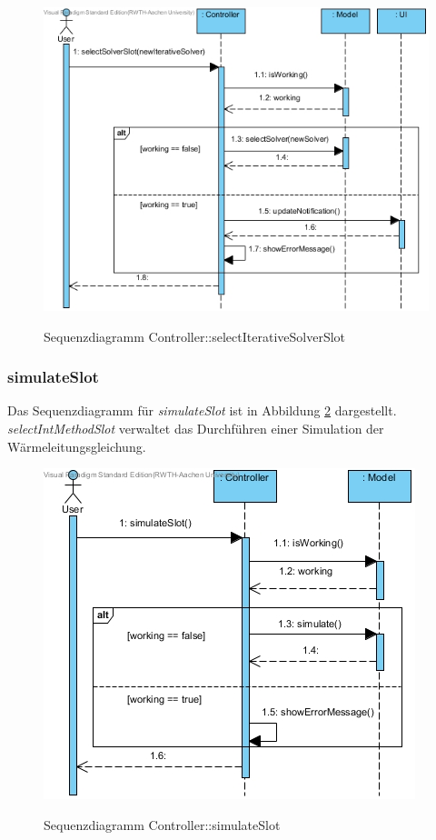 \begin{figure}[H]
	\centering
	\includegraphics[scale=.7]{Bilder/Controller__selectSolverSlot().jpg}\\
	\caption{Sequenzdiagramm Controller::selectIterativeSolverSlot}
	\label{Sequenzdiagramm Controller::selectIterativeSolverSlot}
\end{figure}

\subsubsection*{simulateSlot}

Das Sequenzdiagramm für \emph{simulateSlot} ist in Abbildung \ref{Sequenzdiagramm Controller::simulateSlot} dargestellt. \emph{selectIntMethodSlot} verwaltet das Durchführen einer Simulation der Wärmeleitungsgleichung.

\begin{figure}[H]
	\centering
	\includegraphics[scale=.6]{Bilder/Controller__simulateSlot().jpg}\\
	\caption{Sequenzdiagramm Controller::simulateSlot}
	\label{Sequenzdiagramm Controller::simulateSlot}
\end{figure}

